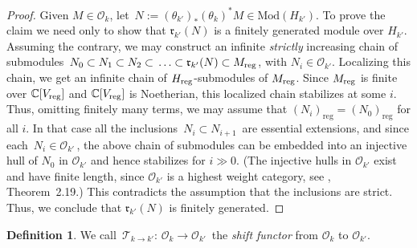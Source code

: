 \documentclass{amsart}
\newtheorem{prop}[theorem]{Proposition}
\theoremstyle{definition}
\newtheorem{defi}[theorem]{Definition}
\theoremstyle{remark}
\numberwithin{equation}{section}
\begin{document}
\begin{proof}
Given $ M \in {\mathcal{O}}_k $, let $\, N := (\theta_{k'})_* (\theta_k)^* M
\in {\mathrm{Mod}}(H_{k'}) $. To prove the claim we need only to show that $
{\mathfrak{r}}_{k'}(N) $ is a finitely generated module over $ H_{k'}$. Assuming the contrary,
we may construct an infinite {\it strictly} increasing chain
of submodules $\,N_0 \subset N_1 \subset N_2 \subset\,
\ldots \subset {\mathfrak{r}}_{k'}(N)\subset {M_{\rm{reg}}}$, with $N_i\in {\mathcal{O}}_{k'}$.
Localizing this chain, we get an infinite chain of
${H_{\rm{reg}}}$-submodules of ${M_{\rm{reg}}}$. Since $ {M_{\rm{reg}}} $ is finite over ${\mathbb{C}}[{V_{\rm{reg}}}]$ and ${\mathbb{C}}[{V_{\rm{reg}}}]$ is
Noetherian, this localized chain stabilizes at some $i$. Thus, omitting
finitely many terms, we may assume
that $(N_i)_{\mathrm{reg}}=(N_0)_{\mathrm{reg}}$ for all $i$. In
that case all the inclusions $\,N_i \subset N_{i+1} \,$ are
essential extensions, and since each $\, N_i \in {\mathcal{O}}_{k'} \,$, the
above chain of submodules can be embedded into an injective hull of
$ N_0 $ in $ {\mathcal{O}}_{k'} $ and hence stabilizes for $ i \gg 0 $. (The
injective hulls in $ {\mathcal{O}}_{k'} $ exist and have finite length, since $
{\mathcal{O}}_{k'} $ is a highest weight category, see \cite{GGOR},
Theorem~2.19.) This contradicts the assumption that the inclusions
are strict. Thus, we conclude that $ {\mathfrak{r}}_{k'}(N) $ is finitely generated.
\end{proof}

\begin{defi}
We call $\, {\mathcal{T}}_{k \to k'}: \,{\mathcal{O}}_k \to {\mathcal{O}}_{k'} \,$ the {\it shift
functor} from $ {\mathcal{O}}_k $ to $ {\mathcal{O}}_{k'}$.
\end{defi}
\end{document}
